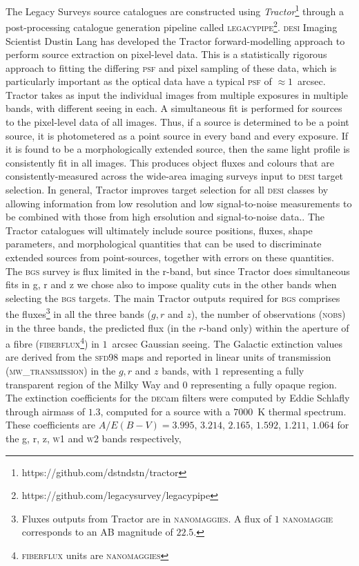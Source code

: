 \documentclass[fleqn,usenatbib]{mnras}
\newcommand{\BGS}{\textsc{bgs}\xspace}
\newcommand{\DECam}{\textsc{dec}am\xspace}
\newcommand{\DESI}{\textsc{desi}\xspace}
\newcommand{\FIBERFLUX}{{\textsc{fiberflux}}\xspace}
\newcommand{\MWTRANSMISSION}{{\textsc{mw\_transmission}}\xspace}
\newcommand{\NOBS}{\textsc{nobs}\xspace}
\newcommand{\PSF}{\textsc{psf}\xspace}
\newcommand{\TRACTOR}{\textsc{T}ractor\xspace}
\newcommand{\Wone}{\textsc{w1}\xspace}
\newcommand{\Wtwo}{\textsc{w2}\xspace}
\newcommand{\LEGACYPIPE}{\textsc{legacypipe}\xspace}
\newcommand{\NANOMAGIES}{\textsc{nanomaggies}\xspace}
\newcommand{\NANOMAGIE}{\textsc{nanomaggie}\xspace}
\begin{document}
The Legacy Surveys source catalogues are constructed using {\it Tractor}\footnote{https://github.com/dstndstn/tractor}\citep{2016ascl.soft04008L} through a post-processing catalogue generation pipeline called \LEGACYPIPE \footnote{https://github.com/legacysurvey/legacypipe}. \DESI Imaging Scientist Dustin Lang has developed the \TRACTOR forward-modelling approach to
perform source extraction on pixel-level data. This is a statistically rigorous approach to fitting the differing \PSF and pixel sampling of these data, which is particularly important as the optical data have a typical \PSF of $\approx 1$~arcsec.
\TRACTOR takes as input the individual images from multiple exposures in multiple
bands, with different seeing in each. A simultaneous fit is performed for sources to the pixel-level data of all images. Thus, if a source is determined to be a point source, it is photometered as a point source in every band and every exposure. If it is found to be a morphologically extended source, then the same light profile is consistently fit in all images. This produces object fluxes and colours that are consistently-measured across the wide-area imaging surveys input to \DESI target selection. In general, \TRACTOR improves target selection for all \DESI classes by allowing information from low resolution and low signal-to-noise measurements to be combined with those from high ersolution and signal-to-noise data.. The \TRACTOR catalogues will ultimately include source positions, fluxes, shape parameters, and morphological quantities that can be used to discriminate extended sources from point-sources, together with errors on these quantities. The \BGS survey is flux limited in the r-band, but since \TRACTOR does simultaneous fits in g, r and z we chose also to impose quality cuts in the other bands when selecting the \BGS targets. The main \TRACTOR outputs required for \BGS comprises the fluxes\footnote{Fluxes outputs from \TRACTOR are in \NANOMAGIES. A flux of $1$ \NANOMAGIE corresponds to an AB magnitude of $22.5$.} in all the three bands ($g,r$ and $z$), the number of observations (\NOBS) in the three bands, the predicted flux (in the $r$-band only) within the aperture of a fibre (\FIBERFLUX\footnote{\FIBERFLUX units are \NANOMAGIES}) in $1$~arcsec Gaussian seeing. The Galactic extinction values are derived from the \textsc{sfd98} maps \citep{1998ApJ...500..525S} and reported in linear units of transmission (\MWTRANSMISSION) in the $g,r$ and $z$ bands, with $1$ representing a fully transparent region of the Milky Way and $0$ representing a fully opaque region. The extinction coefficients for the \DECam filters were computed by Eddie Schlafly \citep{2011ApJ...737..103S} through airmass of $1.3$, computed for a source with a $7000$~K thermal  spectrum. These coefficients are $A / E(B-V) = 3.995$, $3.214$, $2.165$, $1.592$, $1.211$, $1.064$ for the g, r, z, \Wone and \Wtwo bands respectively,
\end{document}

